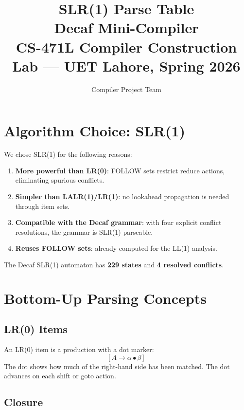 \documentclass[12pt,a4paper]{article}
\title{\textbf{SLR(1) Parse Table}\\
       \large Decaf Mini-Compiler\\
       CS-471L Compiler Construction Lab --- UET Lahore, Spring 2026}
\author{Compiler Project Team}
\date{}
\begin{document}
\maketitle
\tableofcontents
\newpage

\section{Algorithm Choice: SLR(1)}

We chose SLR(1) for the following reasons:

\begin{enumerate}
  \item \textbf{More powerful than LR(0)}: FOLLOW sets restrict reduce actions,
        eliminating spurious conflicts.
  \item \textbf{Simpler than LALR(1)/LR(1)}: no lookahead propagation is needed
        through item sets.
  \item \textbf{Compatible with the Decaf grammar}: with four explicit conflict
        resolutions, the grammar is SLR(1)-parseable.
  \item \textbf{Reuses FOLLOW sets}: already computed for the LL(1) analysis.
\end{enumerate}

The Decaf SLR(1) automaton has \textbf{229 states} and \textbf{4 resolved
conflicts}.

\section{Bottom-Up Parsing Concepts}

\subsection{LR(0) Items}

An LR(0) item is a production with a dot marker:
\[
  [A \to \alpha \bullet \beta]
\]
The dot shows how much of the right-hand side has been matched.
The dot advances on each shift or goto action.

\subsection{Closure}
\end{document}
